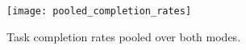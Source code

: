 \begin{figure}
\texttt{[image: pooled\_completion\_rates]}
\caption{Task completion rates pooled over both modes.}
\label{fig:pooled_completion_rates}
\end{figure}
